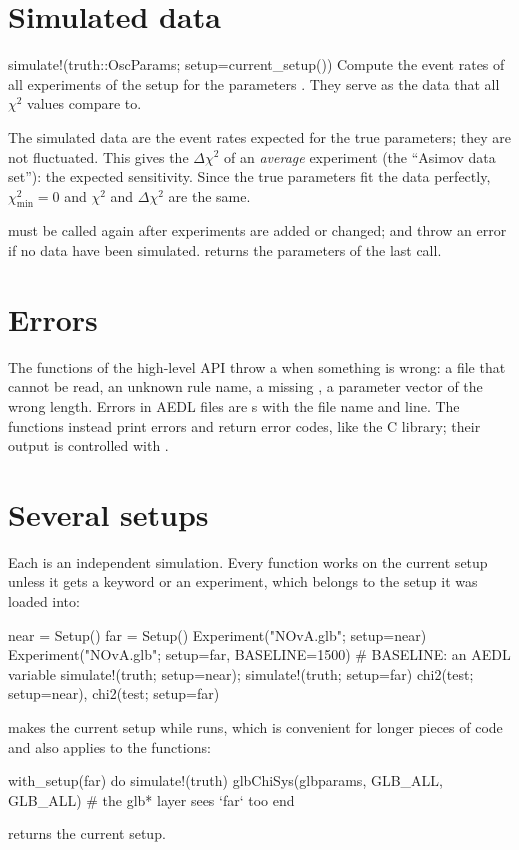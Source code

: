 \section{Simulated data}\label{sec:simulate}

\begin{apifun}{simulate!(truth::OscParams; setup=current\_setup())}
Compute the event rates of all experiments of the setup for the parameters
. They serve as the data that all $\chi^2$ values compare to.
\end{apifun}

\noindent The simulated data are the event rates expected for the true
parameters; they are not fluctuated. This gives the $\Delta\chi^2$ of an
\emph{average} experiment (the ``Asimov data set''): the expected sensitivity.
Since the true parameters fit the data perfectly, $\chi^2_\text{min}=0$ and
$\chi^2$ and $\Delta\chi^2$ are the same.

 must be called again after experiments are added or changed;
 and  throw an error if no data have been
simulated.  returns the parameters of the last call.

\section{Errors}

The functions of the high-level API throw a  when something is
wrong: a file that cannot be read, an unknown rule name, a missing
, a parameter vector of the wrong length. Errors in AEDL files are
s with the file name and line. The  functions instead
print errors and return error codes, like the C library; their output is
controlled with .

\section{Several setups}\label{sec:setups}

Each  is an independent simulation. Every function works on the
current setup unless it gets a  keyword or an experiment, which
belongs to the setup it was loaded into:
\begin{julia}
near = Setup()
far  = Setup()
Experiment("NOvA.glb"; setup=near)
Experiment("NOvA.glb"; setup=far, BASELINE=1500)   # BASELINE: an AEDL variable
simulate!(truth; setup=near); simulate!(truth; setup=far)
chi2(test; setup=near), chi2(test; setup=far)
\end{julia}
 makes  the current setup while 
runs, which is convenient for longer pieces of code and also applies to the
 functions:
\begin{julia}
with_setup(far) do
    simulate!(truth)
    glbChiSys(glbparams, GLB_ALL, GLB_ALL)   # the glb* layer sees `far` too
end
\end{julia}
 returns the current setup.

